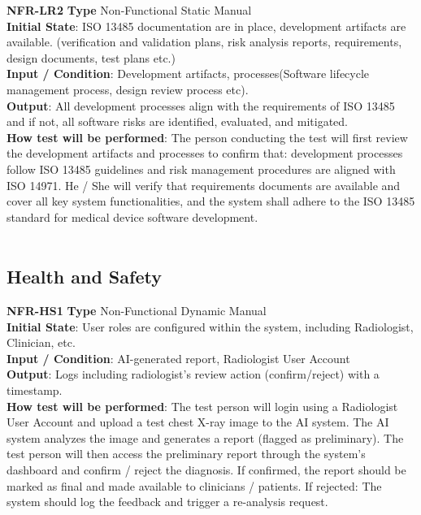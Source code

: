 \documentclass[12pt, titlepage]{article}
\begin{document}
\noindent \textbf{NFR-LR2} \textbf{Type} Non-Functional Static Manual\\
        \indent \textbf{Initial State}: ISO 13485 documentation are in place, development artifacts are available. (verification and validation plans, risk analysis reports, requirements, design documents, test plans etc.)\\
        \indent \textbf{Input / Condition}: Development artifacts, processes(Software lifecycle management process, design review process etc).\\
        \indent \textbf{Output}: All development processes align with the requirements of ISO 13485 and if not, all software risks are identified, evaluated, and mitigated.\\
        \indent \textbf{How test will be performed}: The person conducting the test will first review the development artifacts and processes to confirm that: development processes follow ISO 13485 guidelines and risk management procedures are aligned with ISO 14971. He / She will verify that requirements documents are available and cover all key system functionalities, and the system shall adhere to the ISO 13485 standard for medical device software development.\\
\\
\subsection{Health and Safety}
\textbf{NFR-HS1} \textbf{Type} Non-Functional Dynamic Manual\\
        \indent \textbf{Initial State}: User roles are configured within the system, including Radiologist, Clinician, etc.\\
        \indent \textbf{Input / Condition}: AI-generated report, Radiologist User Account\\
        \indent \textbf{Output}: Logs including radiologist’s review action (confirm/reject) with a timestamp.\\
        \indent \textbf{How test will be performed}: The test person will login using a Radiologist User Account and upload a test chest X-ray image to the AI system. The AI system analyzes the image and generates a report (flagged as preliminary). The test person will then access the preliminary report through the system’s dashboard and confirm / reject the diagnosis. If confirmed, the report should be marked as final and made available to clinicians / patients. If rejected: The system should log the feedback and trigger a re-analysis request. \\
    \\
\end{document}
